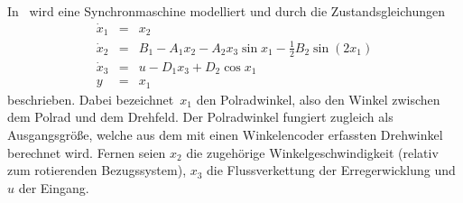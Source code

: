 \begin{example}
\label{exa:Synchronmaschine-HG}In~\cite{mukhopadhyay1972} wird
eine Synchronmaschine modelliert und durch
die Zustandsgleichungen 
\begin{equation}
\begin{array}{lcl}
\dot{x}_{1} & = & x_{2}\\
\dot{x}_{2} & = & B_{1}-A_{1}x_{2}-A_{2}x_{3}\sin x_{1}-\tfrac{1}{2}B_{2}\sin(2x_{1})\\
\dot{x}_{3} & = & u-D_{1}x_{3}+D_{2}\cos x_{1}\\
y & = & x_{1}
\end{array}\label{eq:synchronmotor}
\end{equation}
beschrieben. Dabei bezeichnet~$x_{1}$ den Polradwinkel, also den
Winkel zwischen dem Polrad und dem Drehfeld. Der Polradwinkel fungiert
zugleich als Ausgangsgröße, welche aus dem mit einen Winkelencoder
erfassten Drehwinkel berechnet wird. Fernen seien $x_{2}$ die zugehörige
Winkelgeschwindigkeit (relativ zum rotierenden Bezugssystem), $x_{3}$
die Flussverkettung der Erregerwicklung und $u$ der Eingang.


\end{example}

